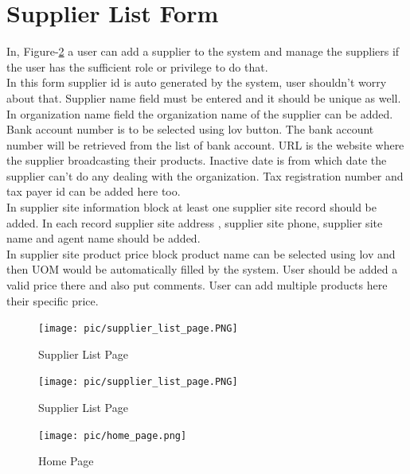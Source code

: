 \documentclass[12pt]{report} %
\begin{document}
\section{Supplier List Form}


In, Figure-\ref{fig:supplier_list_page} a user can add a supplier to the system and manage the suppliers if the user has the sufficient role or privilege to do that. \\
In this form supplier id is auto generated by the system, user shouldn't worry about that. Supplier name field must be entered and it should be unique as well. In organization name field the organization name of the supplier can be added. Bank account number is to be selected using lov button. The bank account number will be retrieved from the list of bank account. URL is the website where the supplier broadcasting their products. Inactive date is from which date the supplier can't do any dealing with the organization. Tax registration number and tax payer id can be added here too.\\
In supplier site information block at least one supplier site record should be added. In each record supplier site address , supplier site phone, supplier site name and agent name should be added.\\
In supplier site product price block product name can be selected using lov and then UOM would be automatically filled by the system. User should be added a valid price there and also put comments. User can add multiple products here their specific price.

\begin{figure}[h]
	\begin{center}
		\texttt{[image: pic/supplier\_list\_page.PNG]}
	\end{center}
	\caption{Supplier List Page}
	\label{fig:supplier_list_page}
\end{figure}


\ifx

\begin{figure}[h]
	\texttt{[image: pic/supplier\_list\_page.PNG]}
	\caption{Supplier List Page}
	\label{fig:supplier_list_page}
\end{figure}
\clearpage

\begin{landscape}
\begin{figure}[h]
		\begin{center}
			\texttt{[image: pic/home\_page.png]}
		\end{center}
	\caption{Home Page}
	\label{fig:home_page}
\end{figure}
\thispagestyle{empty} 
\end{landscape}
\clearpage
\fi
\end{document}
